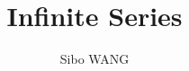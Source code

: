 \documentclass[12pt]{article}
\numberwithin{equation}{section}
\theoremstyle{plain} %
\theoremstyle{definition}
\theoremstyle{remark}
\begin{document}
\title{Infinite Series}


\author{Sibo WANG}







\date{}



\maketitle





\end{document}
